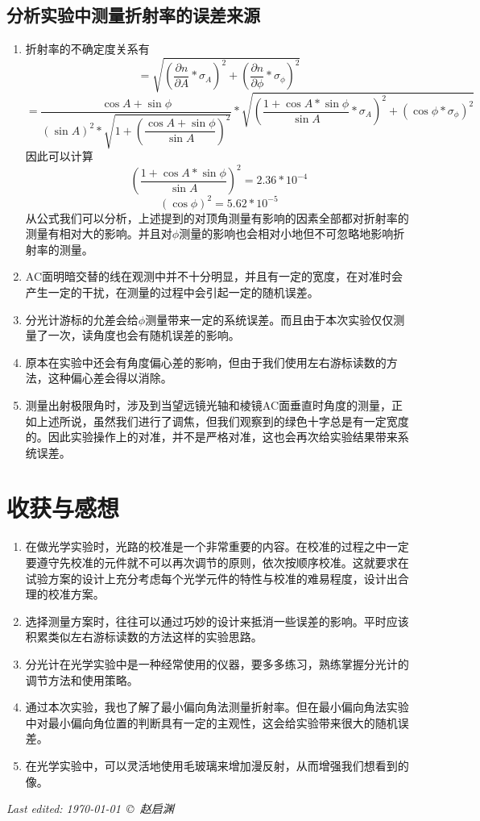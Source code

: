 \documentclass[a4paper,11pt]{article}
\begin{document}
\subsection{分析实验中测量折射率的误差来源}
\begin{enumerate}
	\item 	折射率的不确定度关系有
	$$  = \sqrt{(\dfrac{\partial n}{\partial A} * \sigma_{A})^{2} + (\dfrac{\partial n}{\partial \phi} * \sigma_{\phi})^{2} }$$
	$$ = \dfrac{\cos A + \sin \phi}{(\sin A)^2 *\sqrt{1+(\dfrac{\cos A + \sin \phi}{\sin A})^2}} * \sqrt{(\dfrac{1+ \cos A *\sin \phi}{\sin A}*\sigma_{A})^{2} + (\cos \phi * \sigma_{\phi} )^2}$$
	因此可以计算
	$$(\dfrac{1+ \cos A *\sin \phi}{\sin A})^{2} = 2.36 * 10^{-4}$$
	$$(\cos \phi )^2 = 5.62 * 10^{-5} $$
	从公式我们可以分析，上述提到的对顶角测量有影响的因素全部都对折射率的测量有相对大的影响。并且对$\phi$测量的影响也会相对小地但不可忽略地影响折射率的测量。
	\item  AC面明暗交替的线在观测中并不十分明显，并且有一定的宽度，在对准时会产生一定的干扰，在测量的过程中会引起一定的随机误差。
	\item  分光计游标的允差会给$\phi$测量带来一定的系统误差。而且由于本次实验仅仅测量了一次，读角度也会有随机误差的影响。
	\item 原本在实验中还会有角度偏心差的影响，但由于我们使用左右游标读数的方法，这种偏心差会得以消除。
	\item 测量出射极限角时，涉及到当望远镜光轴和棱镜AC面垂直时角度的测量，正如上述所说，虽然我们进行了调焦，但我们观察到的绿色十字总是有一定宽度的。因此实验操作上的对准，并不是严格对准，这也会再次给实验结果带来系统误差。 \\
\end{enumerate}


	
\section{收获与感想}
\begin{enumerate}
	\item 在做光学实验时，光路的校准是一个非常重要的内容。在校准的过程之中一定要遵守先校准的元件就不可以再次调节的原则，依次按顺序校准。这就要求在试验方案的设计上充分考虑每个光学元件的特性与校准的难易程度，设计出合理的校准方案。
	\item 选择测量方案时，往往可以通过巧妙的设计来抵消一些误差的影响。平时应该积累类似左右游标读数的方法这样的实验思路。
	\item 分光计在光学实验中是一种经常使用的仪器，要多多练习，熟练掌握分光计的调节方法和使用策略。
	\item 通过本次实验，我也了解了最小偏向角法测量折射率。但在最小偏向角法实验中对最小偏向角位置的判断具有一定的主观性，这会给实验带来很大的随机误差。
	\item 在光学实验中，可以灵活地使用毛玻璃来增加漫反射，从而增强我们想看到的像。
\end{enumerate}



	\vfill\noindent\itshape\footnotesize
	\hfill Last edited: \today\ \copyright\ 赵启渊
\end{document}
